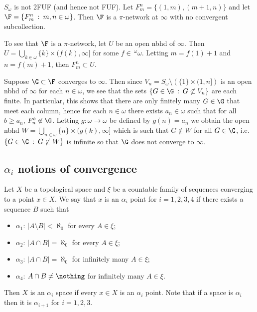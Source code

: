 \documentclass{article}
\begin{document}
\begin{exam}
    \(S_{\omega}\) is not 2FUF (and hence not FUF). Let \(F_m^n = \{(1, m), (m + 1, n)\}\) and let \(\F = \{F_m^n \: : \: m,n \in \omega\}\). Then \(\F\) is a \(\pi\)-network at \(\infty\) with no convergent subcollection. 
    
    To see that \(\F\) is a \(\pi\)-network, let \(U\) be an open nbhd of \(\infty\). Then \(U = \bigcup_{k \in \omega} \{k\} \times (f(k), \infty]\) for some \(f \in \, ^{\omega}\omega\). Letting \(m = f(1) + 1\) and \(n = f(m) + 1\), then \(F_m^n \subset U\).

    Suppose \(\G \subset \F\) converges to \(\infty\). Then since \(V_n = S_{\omega}\setminus \left(\{1\} \times (1, n]\right)\) is an open nbhd of \(\infty\) for each \(n \in \omega\), we see that the sets \(\{G \in \G \: : \: G \not \subset V_n\}\) are each finite. In particular, this shows that there are only finitely many \(G \in \G\) that meet each column, hence for each \(n \in \omega\) there exists \(a_n \in \omega\) such that for all \(b \geq a_n\), \(F_n^b \not \in \G\). Letting \(g:\omega \to \omega\) be defined by \(g(n) = a_n\) we obtain the open nbhd \(W = \bigcup_{n \in \omega} \{n\} \times (g(k), \infty]\) which is such that \(G \not \in W\) for all \(G \in \G\), i.e. \(\{G \in \G \: : \: G \not \subset W\}\) is infinite so that \(\G\) does not converge to \(\infty\).
\end{exam}

\subsection{\(\alpha_i\) notions of convergence}

\begin{defn}
    Let \(X\) be a topological space and \(\xi\) be a countable family of sequences converging to a point \(x \in X\). We say that \(x\) is an \(\alpha_i\) point for \(i = 1, 2, 3, 4\) if there exists a sequence \(B\) such that 
    \begin{itemize}
        \item \(\alpha_1\):  \(|A \setminus B| < \aleph_0\) for every \(A \in \xi\);
        \item \(\alpha_2\): \(|A \cap B| = \aleph_0\) for every \(A \in \xi\);
        \item \(\alpha_3\): \(|A \cap B| = \aleph_0\) for infinitely many \(A \in \xi\);
        \item \(\alpha_4\): \(A \cap B \neq \nothing\) for infinitely many \(A \in \xi\).
    \end{itemize}
    Then \(X\) is an \(\alpha_i\) space if every \(x \in X\) is an \(\alpha_i\) point. Note that if a space is \(\alpha_i\) then it is \(\alpha_{i + 1}\) for \(i =1, 2, 3\).
\end{defn}
\end{document}
